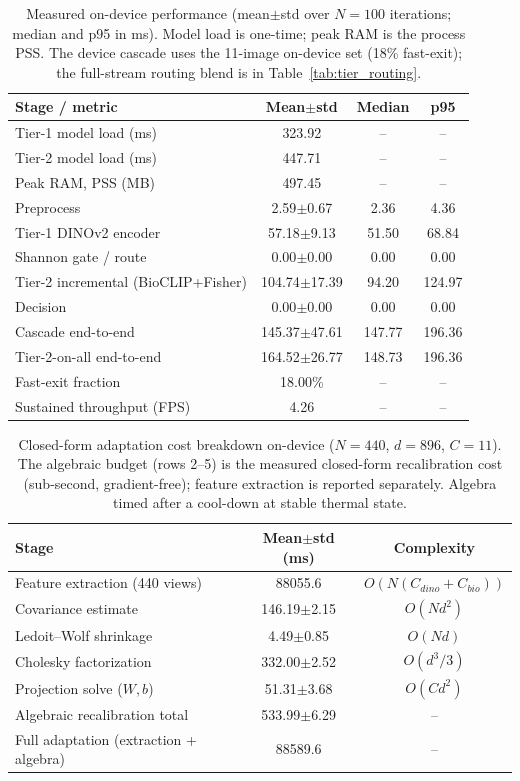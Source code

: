 \documentclass[preprint,12pt]{elsarticle}
\begin{document}
\begin{table}[htbp]
\centering
\caption{Measured on-device performance (mean$\pm$std over $N=100$ iterations; median and p95 in ms). Model load is one-time; peak RAM is the process PSS. The device cascade uses the 11-image on-device set (18\% fast-exit); the full-stream routing blend is in Table~\ref{tab:tier_routing}.}
\label{tab:device_perf}
\small
\begin{tabular}{lccc}
\toprule
Stage / metric & Mean$\pm$std & Median & p95 \\
\midrule
Tier-1 model load (ms) & 323.92 & -- & -- \\
Tier-2 model load (ms) & 447.71 & -- & -- \\
Peak RAM, PSS (MB) & 497.45 & -- & -- \\
\midrule
Preprocess & 2.59$\pm$0.67 & 2.36 & 4.36 \\
Tier-1 DINOv2 encoder & 57.18$\pm$9.13 & 51.50 & 68.84 \\
Shannon gate / route & 0.00$\pm$0.00 & 0.00 & 0.00 \\
Tier-2 incremental (BioCLIP+Fisher) & 104.74$\pm$17.39 & 94.20 & 124.97 \\
Decision & 0.00$\pm$0.00 & 0.00 & 0.00 \\
Cascade end-to-end & 145.37$\pm$47.61 & 147.77 & 196.36 \\
Tier-2-on-all end-to-end & 164.52$\pm$26.77 & 148.73 & 196.36 \\
\midrule
Fast-exit fraction & 18.00\% & -- & -- \\
Sustained throughput (FPS) & 4.26 & -- & -- \\
\bottomrule
\end{tabular}
\end{table}

\begin{table}[htbp]
\centering
\caption{Closed-form adaptation cost breakdown on-device ($N=440$, $d=896$, $C=11$). The algebraic budget (rows 2--5) is the measured closed-form recalibration cost (sub-second, gradient-free); feature extraction is reported separately. Algebra timed after a cool-down at stable thermal state.}
\label{tab:adaptation_breakdown}
\small
\begin{tabular}{lcc}
\toprule
Stage & Mean$\pm$std (ms) & Complexity \\
\midrule
Feature extraction (440 views) & 88055.6 & $O(N(C_{dino}+C_{bio}))$ \\
Covariance estimate & 146.19$\pm$2.15 & $O(Nd^2)$ \\
Ledoit--Wolf shrinkage & 4.49$\pm$0.85 & $O(Nd)$ \\
Cholesky factorization & 332.00$\pm$2.52 & $O(d^3/3)$ \\
Projection solve ($W,b$) & 51.31$\pm$3.68 & $O(Cd^2)$ \\
\midrule
Algebraic recalibration total & 533.99$\pm$6.29 & -- \\
Full adaptation (extraction + algebra) & 88589.6 & -- \\
\bottomrule
\end{tabular}
\end{table}
\end{document}
